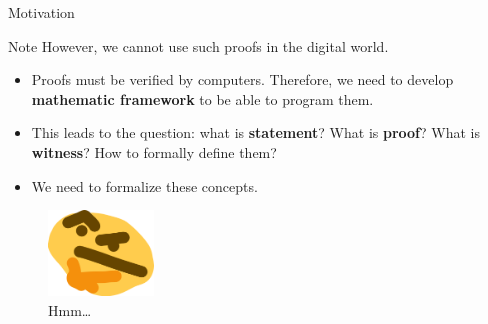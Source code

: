 \documentclass[xcolor={usenames,dvipsnames}]{beamer}
\begin{document}
    \begin{frame}{Motivation}
        \begin{alertblock}{Note}
            However, we cannot use such proofs in the digital world. 
            
            \begin{itemize}
                \item Proofs must be verified by computers. Therefore, we need to develop \textbf{mathematic framework} to be able to program them.
                \item This leads to the question: what is \textbf{statement}? What is \textbf{proof}? What is \textbf{witness}? How to formally define them?
                \item We need to formalize these concepts.
            \end{itemize}
        \end{alertblock}

        \begin{figure}
            \centering
            \includegraphics[width=0.25\textwidth]{images/lecture_6/thonk.png}
            \caption{Hmm\ldots}
        \end{figure}
    \end{frame}
\end{document}
